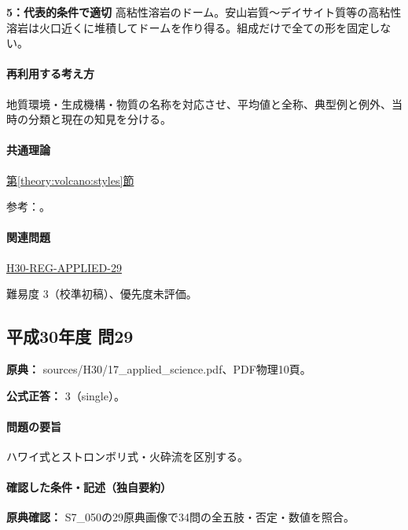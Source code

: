 \noindent\textbf{5：代表的条件で適切} 高粘性溶岩のドーム。安山岩質～デイサイト質等の高粘性溶岩は火口近くに堆積してドームを作り得る。組成だけで全ての形を固定しない。\par

\paragraph{再利用する考え方} 地質環境・生成機構・物質の名称を対応させ、平均値と全称、典型例と例外、当時の分類と現在の知見を分ける。

\paragraph{共通理論} \hyperref[theory:volcano:styles]{第\ref*{theory:volcano:styles}節}

\par 参考：\cite{jma_magma1999,vol50_styles_ref}。

\paragraph{関連問題} \hyperref[q:h30-reg-applied-29]{H30-REG-APPLIED-29}

\par 難易度 3（校準初稿）、優先度未評価。

\subsection{平成30年度 問29}
\label{q:h30-reg-applied-29}

\noindent\textbf{原典：} sources/H30/17\_applied\_science.pdf、PDF物理10頁。

\textbf{公式正答：} 3（single）。

\paragraph{問題の要旨} ハワイ式とストロンボリ式・火砕流を区別する。

\paragraph{確認した条件・記述（独自要約）}\mbox{}\par

\noindent\textbf{原典確認：} S7\_050の29原典画像で34問の全五肢・否定・数値を照合。\par

